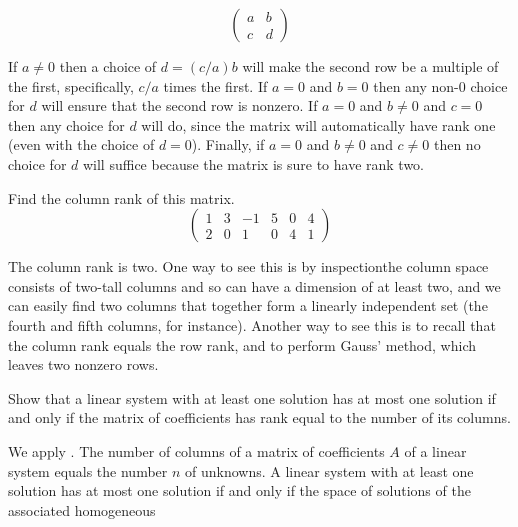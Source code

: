 \begin{exercises}
\begin{equation*}
      \begin{pmatrix}
         a  &b  \\
         c  &d
      \end{pmatrix}
    \end{equation*}
    \begin{answer}
      If \( a\neq 0 \) then a choice of \( d=(c/a)b \) will make the second
      row be a multiple of the first, specifically, \( c/a \) times the first.
      If \( a=0 \) and \( b=0 \) then any non-\( 0 \) choice for \( d \) 
      will ensure that
      the second row is nonzero.
      If \( a=0 \) and \( b\neq 0 \) and \( c=0 \) then any choice for \( d \)
      will do, since the matrix will automatically have rank one (even with
      the choice of $d=0$).
      Finally, if \( a=0 \) and \( b\neq 0 \) and \( c\neq 0 \) then
      no choice for \( d \) will suffice because the matrix is sure to have 
      rank two.   
    \end{answer}
  \item 
    Find the column rank of this matrix.
    \begin{equation*}
      \begin{pmatrix}
        1  &3  &-1  &5  &0  &4  \\
        2  &0  &1   &0  &4  &1
      \end{pmatrix}
    \end{equation*}
    \begin{answer}
      The column rank is two.
      One way to see this is by inspection\Dash the column space consists of
      two-tall columns and so can have a dimension of at least two, and we
      can easily find two columns that together form a linearly independent
      set (the fourth and fifth columns, for instance).
      Another way to see this is to recall that 
      the column rank equals the row rank, and to perform Gauss' method, 
      which leaves two nonzero rows.
    \end{answer}
  \item 
    Show that a linear system with at least one solution has at most 
    one solution if
    and only if the matrix of coefficients has rank equal to the number of
    its columns.
    \begin{answer}
      We apply .  
      The number of columns of a matrix of coefficients $A$ of a linear 
      system equals the number $n$ of unknowns.
      A linear system with at least one solution has at most one solution
      if and only if the space of solutions of the associated homogeneous

\end{answer}
\end{exercises}
